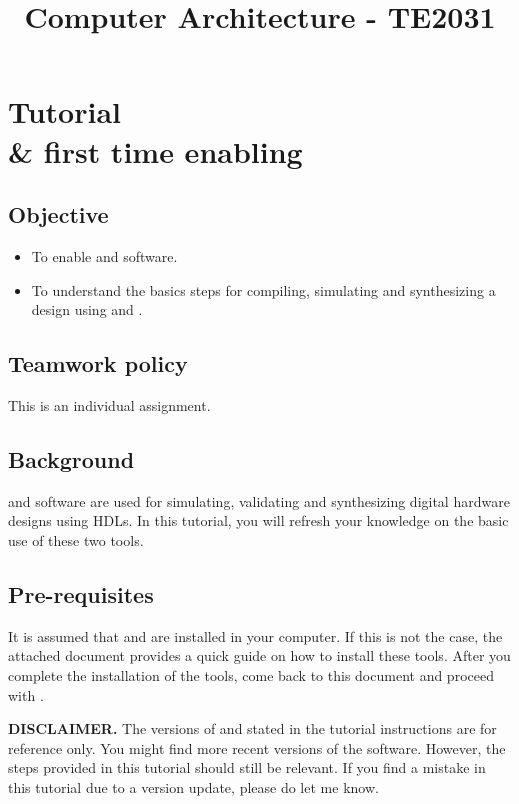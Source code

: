 \documentclass[number=01]{assignment}
\title{Computer Architecture - TE2031}
\begin{document}
\setcounter{chapter}{1}

\chapter*{Tutorial \\ \ModelSim \& \Quartus first time enabling}
\section{Objective}
\begin{itemize}
\item To enable \ModelSim and \Quartus software.
\item To understand the basics steps for compiling, simulating and synthesizing a \SV design using \ModelSim and \Quartus.
\end{itemize}

\section{Teamwork policy}
This is an individual assignment. 

\section{Background}
\ModelSim and \Quartus software are used for simulating, validating and synthesizing digital hardware designs using \acp{HDL}.
In this tutorial, you will refresh your knowledge on the basic use of these two tools. 

\section{Pre-requisites}
It is assumed that \ModelSim and \Quartus are installed in your computer.
If this is not the case, the attached document  provides a quick guide on how to install these tools.
After you complete the installation of the tools, come back to this document and proceed with .

\textbf{DISCLAIMER.} The versions of \ModelSim and \Quartus stated in the tutorial instructions  are for reference only. 
You might find more recent versions of the software. However, the steps provided in this tutorial should still be relevant.
If you find a mistake in this tutorial due to a version update, please do let me know.
 
\end{document}
